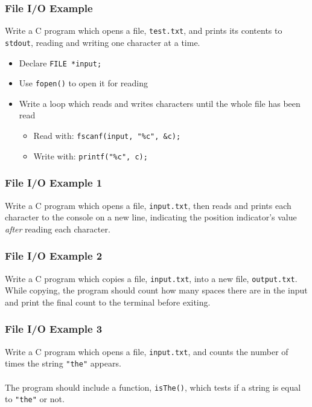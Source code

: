 \documentclass[14pt]{beamer}
\begin{document}
\begin{frame}
\frametitle{File I/O Example}
Write a C program which opens a file, \texttt{test.txt}, and prints its contents to \texttt{stdout}, reading and writing one character at a time.
\begin{itemize}
\pause
\item Declare \texttt{FILE *input;}
\pause
\item Use \texttt{fopen()} to open it for reading
\pause
\item Write a loop which reads and writes characters until the whole file has been read
	\begin{itemize}
		\item Read with: \texttt{fscanf(input, "\%c", \&c);}
		\item Write with: \texttt{printf("\%c", c);}
	\end{itemize}
\end{itemize}
\end{frame}

\begin{frame}
\frametitle{File I/O Example 1}
Write a C program which opens a file, \texttt{input.txt}, then reads and prints each character to the console on a new line, indicating the position indicator's value \textit{after} reading each character.
\end{frame}

\begin{frame}
\frametitle{File I/O Example 2}
Write a C program which copies a file, \texttt{input.txt}, into a new file, \texttt{output.txt}. While copying, the program should count how many spaces there are in the input and print the final count to the terminal before exiting.
\end{frame}

\begin{frame}
\frametitle{File I/O Example 3}
Write a C program which opens a file, \texttt{input.txt}, and counts the number of times the string \texttt{"the"} appears.
\\~\\
The program should include a function, \texttt{isThe()}, which tests if a string is equal to \texttt{"the"} or not.
\end{frame}
\end{document}
